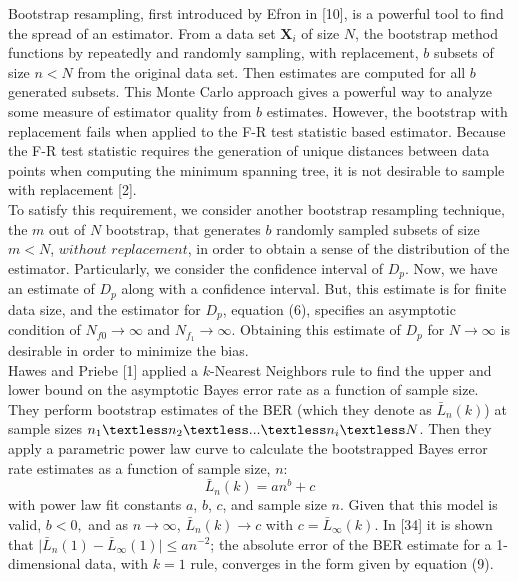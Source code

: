 \documentclass{article}
\begin{document}
	\indent Bootstrap resampling, first introduced by Efron in [10], is a powerful tool to find the spread of an estimator. From a data set $\textbf{X}_i$ of size $N$, the bootstrap method functions by repeatedly and randomly sampling, with replacement, $b$ subsets of size $n<N$ from the original data set. Then estimates are computed for all $b$ generated subsets. This Monte Carlo approach gives a powerful way to analyze some measure of estimator quality from $b$ estimates. However, the bootstrap with replacement fails when applied to the F-R test statistic based estimator. Because the F-R test statistic requires the generation of unique distances between data points when computing the minimum spanning tree, it is not desirable to sample with replacement [2]. 
	\\ [0.5ex]
	
	\indent To satisfy this requirement, we consider another bootstrap resampling technique, the $m$ out of $N$ bootstrap, that generates $b$ randomly sampled subsets of size $m<N$, $without$ $replacement$, in order to obtain a sense of the distribution of the estimator. Particularly, we consider the confidence interval of ${D}_p$. Now, we have an estimate of ${D}_p$ along with a confidence interval. But, this estimate is for finite data size, and the estimator for ${D}_p$, equation (6), specifies an asymptotic condition of $N_{f0} \rightarrow \infty$ and $N_{f_1} \rightarrow \infty$. Obtaining this estimate of ${D}_p$ for $N \rightarrow \infty$ is desirable in order to minimize the bias. 
	\\ [0.5ex]
	
	\indent Hawes and Priebe [1] applied a $k$-Nearest Neighbors rule to find the upper and lower bound on the asymptotic Bayes error rate as a function of sample size. They perform bootstrap estimates of the BER (which they denote as $\bar{L}_n(k)$) at sample sizes $n_1 \textless n_2 \textless ... \textless n_i \textless N$. Then they apply a parametric power law curve to calculate the bootstrapped Bayes error rate estimates as a function of sample size, $n$:
		\begin{equation}
		\bar{L}_n(k)=an^b+c
		\end{equation}
	with power law fit constants $a$, $b$, $c$, and sample size $n$. Given that this model is valid, $b<0,$ and as $n \rightarrow \infty$, $\bar{L}_n(k)\rightarrow c$ with $c=\bar{L}_\infty(k)$. In [34] it is shown that $\vert \bar{L}_n(1)-\bar{L}_\infty (1) \vert \leq an^{-2}$; the absolute error of the BER estimate for a 1-dimensional data, with $k=1$ rule, converges in the form given by equation (9). 
	\\[0.5ex]
	
\end{document}
